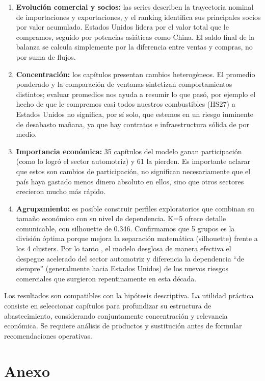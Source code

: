 \documentclass[
  spanish,
  10pt,
]{article}
\begin{document}
\begin{enumerate}
\def\labelenumi{\arabic{enumi}.}
\item
  \textbf{Evolución comercial y socios:} las series describen la
  trayectoria nominal de importaciones y exportaciones, y el ranking
  identifica sus principales socios por valor acumulado. Estados Unidos
  lidera por el valor total que le compramos, seguido por potencias
  asiáticas como China. El saldo final de la balanza se calcula
  simplemente por la diferencia entre ventas y compras, no por suma de
  flujos.
\item
  \textbf{Concentración:} los capítulos presentan cambios heterogéneos.
  El promedio ponderado y la comparación de ventanas sintetizan
  comportamientos distintos; evaluar promedios nos ayuda a resumir lo
  que pasó, por ejemplo el hecho de que le compremos casi todos nuestros
  combustibles (HS27) a Estados Unidos no significa, por sí solo, que
  estemos en un riesgo inminente de desabasto mañana, ya que hay
  contratos e infraestructura sólida de por medio.
\item
  \textbf{Importancia económica:} 35 capítulos del modelo ganan
  participación (como lo logró el sector automotriz) y 61 la pierden. Es
  importante aclarar que estos son cambios de participación, no
  significan necesariamente que el país haya gastado menos dinero
  absoluto en ellos, sino que otros sectores crecieron mucho más rápido.
\item
  \textbf{Agrupamiento:} es posible construir perfiles exploratorios que
  combinan su tamaño económico con su nivel de dependencia. K=5 ofrece
  detalle comunicable, con silhouette de 0.346. Confirmamos que 5 grupos
  es la división óptima porque mejora la separación matemática
  (silhouette) frente a los 4 clusters. Por lo tanto , el modelo
  desglosa de manera efectiva el despegue acelerado del sector
  automotriz y diferencia la dependencia ``de siempre'' (generalmente
  hacia Estados Unidos) de los nuevos riesgos comerciales que surgieron
  repentinamente en esta década.
\end{enumerate}

Los resultados son compatibles con la hipótesis descriptiva. La utilidad
práctica consiste en seleccionar capítulos para profundizar su
estructura de abastecimiento, considerando conjuntamente concentración y
relevancia económica. Se requiere análisis de productos y sustitución
antes de formular recomendaciones operativas.

\section{Anexo}\label{anexo}
\end{document}
